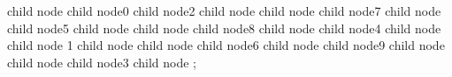 child { node {} %
	child { node{0} } %
	child { node{2} } %
	child { node{} %
		child { node{} } %
		child { node{7} } %
		child { node{} } %
		child { node{5} } } %
	child { node{} } } %
child { node{} }%
child { node{8} }%
child { node{} %
	child { node{4} } %
	child { node{} %
		child { node {1} } %
		child { node {} } %
		child { node {} %
			child { node{6} } %
			child { node{} } %
			child { node{9} } %
			child { node{} } %
		}
		child { node {} } }%
	child { node{3} } %
	child{ node{} } }; %